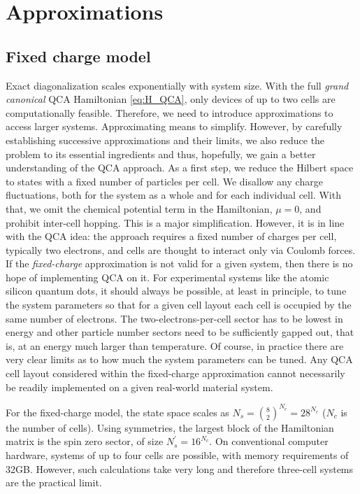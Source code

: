\chapter{Approximations}
\label{ch:approximations}
\graphicspath{{../gfx/chapter02/}{../plots/chapter02/}}

\section{Fixed charge model}

Exact diagonalization scales exponentially with system size. With the full
\emph{grand canonical} QCA Hamiltonian \eqref{eq:H_QCA}, only devices of up to
two cells are computationally feasible. Therefore, we need to introduce
approximations to access larger systems. Approximating means to simplify.
However, by carefully establishing successive approximations and their limits,
we also reduce the problem to its essential ingredients and thus, hopefully, we
gain a better understanding of the QCA approach. As a first step, we reduce the
Hilbert space to states with a fixed number of particles per cell. We disallow
any charge fluctuations, both for the system as a whole and for each individual
cell. With that, we omit the chemical potential term in the Hamiltonian, $\mu =
0$, and prohibit inter-cell hopping. This is a major simplification. However, it
is in line with the QCA idea: the approach requires a fixed number of charges
per cell, typically two electrons, and cells are thought to interact only via
Coulomb forces. If the \emph{fixed-charge} approximation is not valid for a
given system, then there is no hope of implementing QCA on it. For experimental
systems like the atomic silicon quantum dots, it should always be possible, at
least in principle, to tune the system parameters so that for a given cell
layout each cell is occupied by the same number of electrons. The
two-electrons-per-cell sector has to be lowest in energy and other particle
number sectors need to be sufficiently gapped out, that is, at an energy much
larger than temperature. Of course, in practice there are very clear limits as
to how much the system parameters can be tuned. Any QCA cell layout considered
within the fixed-charge approximation cannot necessarily be readily implemented
on a given real-world material system.

For the fixed-charge model, the state space scales as $N_s = \binom{8}{2}^{N_c}
= 28^{N_c}$ ($N_c$ is the number of cells). Using symmetries, the largest block
of the Hamiltonian matrix is the spin zero sector, of size $N_s^{\prime} =
16^{N_c}$. On conventional computer hardware, systems of up to four cells are
possible, with memory requirements of 32GB. However, such calculations take very
long and therefore three-cell systems are the practical limit.


